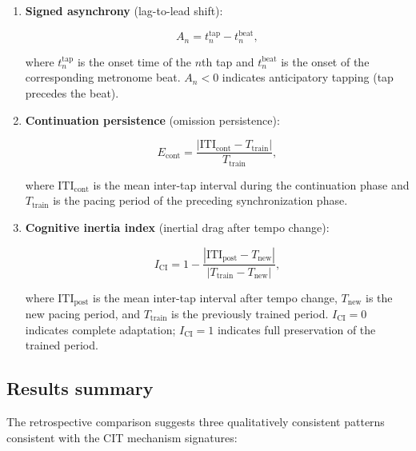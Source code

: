 \documentclass[12pt,a4paper]{article}
\begin{document}
\begin{enumerate}

\item \textbf{Signed asynchrony} (lag-to-lead shift):

\[

A_n = t_n^{\mathrm{tap}} - t_n^{\mathrm{beat}},

\]

where $t_n^{\mathrm{tap}}$ is the onset time of the $n$th tap and $t_n^{\mathrm{beat}}$ is the onset of the corresponding metronome beat. $A_n < 0$ indicates anticipatory tapping (tap precedes the beat).



\item \textbf{Continuation persistence} (omission persistence):

\[

E_{\mathrm{cont}} = \frac{|\mathrm{ITI}_{\mathrm{cont}} - T_{\mathrm{train}}|}{T_{\mathrm{train}}},

\]

where $\mathrm{ITI}_{\mathrm{cont}}$ is the mean inter-tap interval during the continuation phase and $T_{\mathrm{train}}$ is the pacing period of the preceding synchronization phase.



\item \textbf{Cognitive inertia index} (inertial drag after tempo change):

\[

I_{\mathrm{CI}} = 1 - \frac{|\mathrm{ITI}_{\mathrm{post}} - T_{\mathrm{new}}|}{|T_{\mathrm{train}} - T_{\mathrm{new}}|},

\]

where $\mathrm{ITI}_{\mathrm{post}}$ is the mean inter-tap interval after tempo change, $T_{\mathrm{new}}$ is the new pacing period, and $T_{\mathrm{train}}$ is the previously trained period. $I_{\mathrm{CI}} = 0$ indicates complete adaptation; $I_{\mathrm{CI}} = 1$ indicates full preservation of the trained period.



\end{enumerate}



\subsection{Results summary}



The retrospective comparison suggests three qualitatively consistent patterns consistent with the CIT mechanism signatures:
\end{document}
